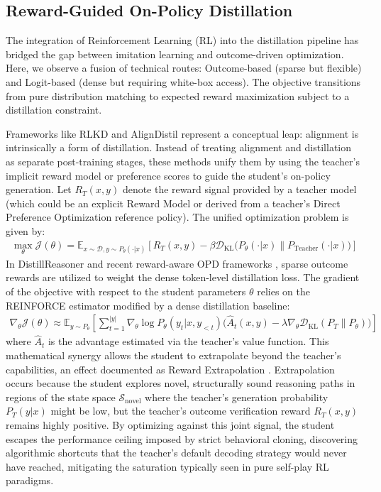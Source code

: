 \documentclass{article} %
\begin{document}
\subsection{Reward-Guided On-Policy Distillation}
The integration of Reinforcement Learning (RL) into the distillation pipeline has bridged the gap between imitation learning and outcome-driven optimization. Here, we observe a fusion of technical routes: Outcome-based (sparse but flexible) and Logit-based (dense but requiring white-box access). The objective transitions from pure distribution matching to expected reward maximization subject to a distillation constraint.

Frameworks like RLKD \citep{2505.16142} and AlignDistil \citep{2503.02832} represent a conceptual leap: alignment is intrinsically a form of distillation. Instead of treating alignment and distillation as separate post-training stages, these methods unify them by using the teacher's implicit reward model or preference scores to guide the student's on-policy generation. Let $R_T(x, y)$ denote the reward signal provided by a teacher model (which could be an explicit Reward Model or derived from a teacher's Direct Preference Optimization reference policy). The unified optimization problem is given by:
\begin{align}
\max_{\theta} \mathcal{J}(\theta) = \mathbb{E}_{x \sim \mathcal{D}, y \sim P_\theta(\cdot|x)} \left[ R_T(x, y) - \beta \mathcal{D}_{\text{KL}}\big(P_\theta(\cdot|x) \parallel P_{\text{Teacher}}(\cdot|x)\big) \right] \label{eq:rlkd}
\end{align}
In DistillReasoner \citep{2408.06037} and recent reward-aware OPD frameworks \citep{2503.04711}, sparse outcome rewards are utilized to weight the dense token-level distillation loss. The gradient of the objective with respect to the student parameters $\theta$ relies on the REINFORCE estimator modified by a dense distillation baseline:
\begin{align}
\nabla_\theta \mathcal{J}(\theta) \approx \mathbb{E}_{y \sim P_\theta} \left[ \sum_{t=1}^{|y|} \nabla_\theta \log P_\theta(y_t | x, y_{<t}) \Big( \hat{A}_t(x, y) - \lambda \nabla_\theta \mathcal{D}_{\text{KL}}(P_T \parallel P_\theta) \Big) \right]
\end{align}
where $\hat{A}_t$ is the advantage estimated via the teacher's value function. This mathematical synergy allows the student to extrapolate beyond the teacher's capabilities, an effect documented as Reward Extrapolation \citep{2602.12125}. Extrapolation occurs because the student explores novel, structurally sound reasoning paths in regions of the state space $\mathcal{S}_{\text{novel}}$ where the teacher's generation probability $P_T(y|x)$ might be low, but the teacher's outcome verification reward $R_T(x, y)$ remains highly positive. By optimizing against this joint signal, the student escapes the performance ceiling imposed by strict behavioral cloning, discovering algorithmic shortcuts that the teacher's default decoding strategy would never have reached, mitigating the saturation typically seen in pure self-play RL paradigms.
\end{document}
